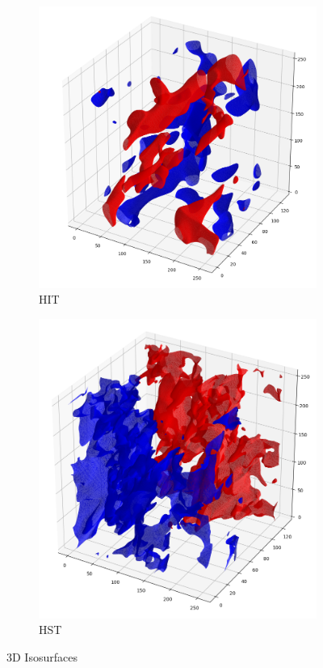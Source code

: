 \documentclass[12pt]{article}
\begin{document}
\begin{figure}
\centering
\begin{subfigure}{0.5\linewidth}
\centering
\includegraphics[width=\linewidth]{./figures/12-hit.png}
\caption{HIT}
\end{subfigure}%
\begin{subfigure}{0.5\linewidth}
\centering
\includegraphics[width=\linewidth]{./figures/12-hst.png}
\caption{HST}
\end{subfigure}
\caption{3D Isosurfaces}
\label{fig:iso}
\end{figure}
\end{document}
